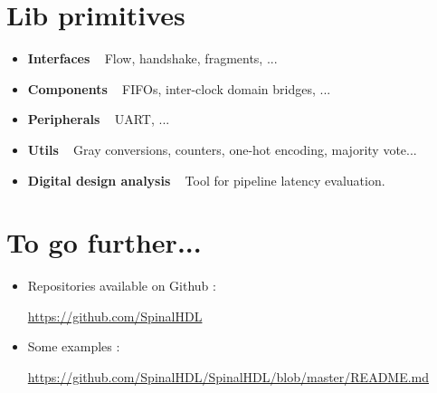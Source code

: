 \documentclass[10pt,twocolumn]{article}
\begin{document}
	\section{Lib primitives}
		\begin{itemize}[itemsep=0ex,label=$\textendash$]
			\item \textbf{Interfaces} ~ Flow, handshake, fragments, ...
			\item \textbf{Components} ~ FIFOs, inter-clock domain bridges, ...
			\item \textbf{Peripherals} ~ UART, ...
			\item \textbf{Utils} ~ Gray conversions, counters, one-hot encoding, majority vote...
			\item \textbf{Digital design analysis} ~ Tool for pipeline latency evaluation.
		\end{itemize}
		
	\section{To go further...}
		\begin{itemize}[itemsep=0ex,label=$\textendash$]
			\item Repositories available on Github : \\ \begin{footnotesize} \url{https://github.com/SpinalHDL} \end{footnotesize}
			\item Some examples : \\ \begin{footnotesize} \url{https://github.com/SpinalHDL/SpinalHDL/blob/master/README.md} \end{footnotesize}
		\end{itemize}
		
\end{document}
